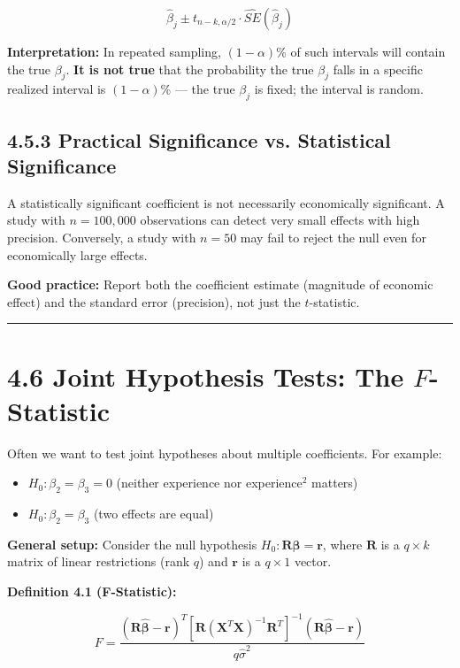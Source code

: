 \[
\hat{\beta}_j \pm t_{n-k, \alpha/2} \cdot \widehat{SE}(\hat{\beta}_j)
\]

\textbf{Interpretation:} In repeated sampling, $(1-\alpha)$\% of such intervals will contain the true $\beta_j$. \textbf{It is not true} that the probability the true $\beta_j$ falls in a specific realized interval is $(1-\alpha)$\% --- the true $\beta_j$ is fixed; the interval is random.

\subsection{4.5.3 Practical Significance vs. Statistical Significance}

A statistically significant coefficient is not necessarily economically significant. A study with $n = 100{,}000$ observations can detect very small effects with high precision. Conversely, a study with $n = 50$ may fail to reject the null even for economically large effects.

\textbf{Good practice:} Report both the coefficient estimate (magnitude of economic effect) and the standard error (precision), not just the $t$-statistic.

\medskip\hrule\medskip

\section{4.6 Joint Hypothesis Tests: The $F$-Statistic}

Often we want to test joint hypotheses about multiple coefficients. For example:
\begin{itemize}
\item $H_0: \beta_2 = \beta_3 = 0$ (neither experience nor experience$^{2}$ matters)
\item $H_0: \beta_2 = \beta_3$ (two effects are equal)
\end{itemize}

\textbf{General setup:} Consider the null hypothesis $H_0: \mathbf{R}\boldsymbol{\beta} = \mathbf{r}$, where $\mathbf{R}$ is a $q \times k$ matrix of linear restrictions (rank $q$) and $\mathbf{r}$ is a $q \times 1$ vector.

\textbf{Definition 4.1 (F-Statistic):}

\[
F = \frac{(\mathbf{R}\hat{\boldsymbol{\beta}} - \mathbf{r})^T \left[\mathbf{R}(\mathbf{X}^T\mathbf{X})^{-1}\mathbf{R}^T\right]^{-1} (\mathbf{R}\hat{\boldsymbol{\beta}} - \mathbf{r})}{q \hat{\sigma}^2}
\]

